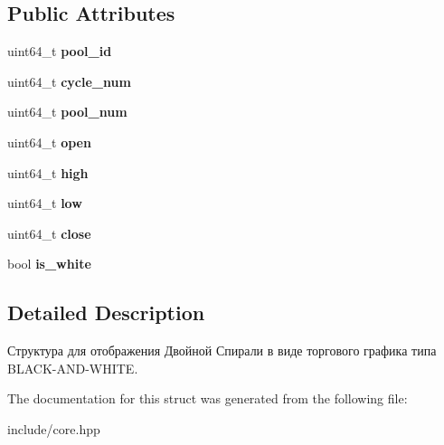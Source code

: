 \subsection*{Public Attributes}
\begin{DoxyCompactItemize}
\item 
\mbox{\label{structbwtradegraph_acfa9ef5e4f6d67b1957f0d48b432c824}} 
uint64\+\_\+t {\bfseries pool\+\_\+id}
\item 
\mbox{\label{structbwtradegraph_a1d72d90e14e12cfcf6f013b4a1616ef5}} 
uint64\+\_\+t {\bfseries cycle\+\_\+num}
\item 
\mbox{\label{structbwtradegraph_aa1fe7048fd9317355d7e1a29cc8a46e5}} 
uint64\+\_\+t {\bfseries pool\+\_\+num}
\item 
\mbox{\label{structbwtradegraph_ab7b42c19235f0979ed66f2582cd63fa8}} 
uint64\+\_\+t {\bfseries open}
\item 
\mbox{\label{structbwtradegraph_af013eda31c295b475060840c0898d4f6}} 
uint64\+\_\+t {\bfseries high}
\item 
\mbox{\label{structbwtradegraph_a303e09c6464e5eebde73ee5222fb371a}} 
uint64\+\_\+t {\bfseries low}
\item 
\mbox{\label{structbwtradegraph_a6c83afcc1c4c2e5882a13c7c2da02c54}} 
uint64\+\_\+t {\bfseries close}
\item 
\mbox{\label{structbwtradegraph_a138cd8201cbb657b3dcbeba547c9c279}} 
bool {\bfseries is\+\_\+white}
\end{DoxyCompactItemize}


\subsection{Detailed Description}
Структура для отображения Двойной Спирали в виде торгового графика типа B\+L\+A\+C\+K-\/\+A\+N\+D-\/\+W\+H\+I\+TE. 

The documentation for this struct was generated from the following file\+:\begin{DoxyCompactItemize}
\item 
include/core.\+hpp\end{DoxyCompactItemize}
